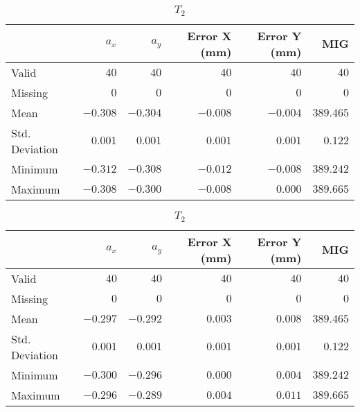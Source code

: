 \begin{table}[h]
    \centering
    \begin{subtable}{\textwidth}
        \centering
        \footnotesize
        \begin{tabular}{lrrrrr}
            \toprule
                & $a_x$ & $a_y$ & Error X (mm) & Error Y (mm) & MIG  \\
            \midrule
            Valid & $40$ & $40$ & $40$ & $40$ & $40$  \\
            Missing & $0$ & $0$ & $0$ & $0$ & $0$  \\
            Mean & $-0.308$ & $-0.304$ & $-0.008$ & $-0.004$ & $389.465$  \\
            Std. Deviation & $0.001$ & $0.001$ & $0.001$ & $0.001$ & $0.122$  \\
            Minimum & $-0.312$ & $-0.308$ & $-0.012$ & $-0.008$ & $389.242$  \\
            Maximum & $-0.308$ & $-0.300$ & $-0.008$ & $0.000$ & $389.665$  \\
            \bottomrule
        \end{tabular}
        \caption{$T_1$}
    \end{subtable}
    
    \vspace{10pt} %
    
    \begin{subtable}{\textwidth}
        \centering
        \footnotesize
        \begin{tabular}{lrrrrr}
            \toprule
                & $a_x$ & $a_y$ & Error X (mm) & Error Y (mm) & MIG  \\
            \midrule
			Valid & $40$ & $40$ & $40$ & $40$ & $40$  \\
			Missing & $0$ & $0$ & $0$ & $0$ & $0$  \\
			Mean & $-0.297$ & $-0.292$ & $0.003$ & $0.008$ & $389.465$  \\
			Std. Deviation & $0.001$ & $0.001$ & $0.001$ & $0.001$ & $0.122$  \\
			Minimum & $-0.300$ & $-0.296$ & $0.000$ & $0.004$ & $389.242$  \\
			Maximum & $-0.296$ & $-0.289$ & $0.004$ & $0.011$ & $389.665$  \\
            \bottomrule
        \end{tabular}
        \caption{$T_2$}
    \end{subtable}


\end{table}
